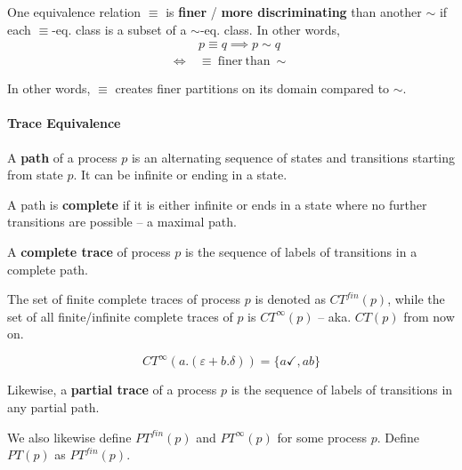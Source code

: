 \documentclass[99-notes-packed.tex]{subfiles}
\begin{document}
\begin{definition}
    One equivalence relation $\equiv$ is \textbf{finer} / \textbf{more discriminating} than another $\sim$ if each $\equiv$-eq. class is a subset of a $\sim$-eq. class. In other words,
    \begin{align*}
            \ &p \equiv q \implies p \sim q \\
        \iff\ &\equiv\ \mathrm{finer\ than}\ \sim
    \end{align*}

    In other words, $\equiv$ creates finer partitions on its domain compared to $\sim$. 
\end{definition}

\paragraph*{Trace Equivalence}
\begin{definition}[path]
    A \textbf{path} of a process $p$ is an alternating sequence of states and transitions starting from state $p$. It can be infinite or ending in a state. 
    
    A path is \textbf{complete} if it is either infinite or ends in a state where no further transitions are possible -- a maximal path.
\end{definition}

\begin{definition}
    A \textbf{complete trace} of process $p$ is the sequence of labels of transitions in a complete path. 
    
    The set of finite complete traces of process $p$ is denoted as ${CT}^{fin}(p)$, while the set of all finite/infinite complete traces of $p$ is ${CT}^{\infty}(p)$ -- aka. $CT(p)$ from now on.
\end{definition}

\begin{example}[${CT}^{\infty}$]
    \begin{equation*}
        {CT}^{\infty}(a.(\varepsilon + b.\delta)) = \{a\checkmark, ab\}
    \end{equation*}
\end{example}

\begin{definition}
    Likewise, a \textbf{partial trace} of a process $p$ is the sequence of labels of transitions in any partial path. 

    We also likewise define ${PT}^{fin}(p)$ and ${PT}^{\infty}(p)$ for some process $p$. Define $PT(p)$ as ${PT}^{fin}(p)$. 
\end{definition}
\end{document}

